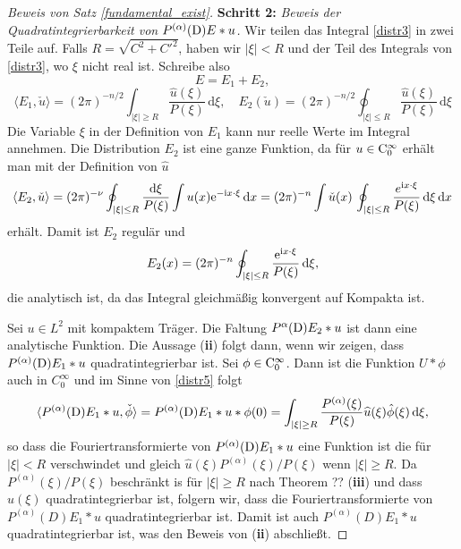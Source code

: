 \begin{proof}[Beweis von Satz \ref{fundamental_exist}]
\textbf{Schritt 2:} \emph{Beweis der Quadratintegrierbarkeit von $P^{(\alpha)}(\mathrm D) E * u$.}
Wir teilen das Integral \eqref{distr3} in zwei Teile auf. Falls $R=\sqrt{C^2 + C'^2}$, haben wir $|\xi|<R$ und der Teil des Integrals von \eqref{distr3}, wo $\xi$ nicht real ist. Schreibe also 
\begin{equation}\label{distr4}
E=E_1 + E_2,
\end{equation}
\begin{equation}\label{distr5}
\langle E_1,\check u\rangle = (2\pi)^{-n/2} \int_{|\xi|\ge R} \frac{\widehat u(\xi)}{P(\xi)}\, \mathrm d\xi, \quad E_2(\check u)= (2\pi)^{-n/2} \oint_{|\xi|\le R} \frac{\widehat u(\xi)}{P(\xi)}\, \mathrm d\xi
\end{equation}
Die Variable $\xi$ in der Definition von $E_1$ kann nur reelle Werte im Integral annehmen. Die Distribution $E_2$ ist eine ganze Funktion, da für $u\in\mathrm C_0^\infty$ erhält man mit der Definition von $\widehat u$
\begin{equation}
\langle E_2, \check u\rangle = (2\pi)^{-\nu} \oint_{|\xi |\le R} \frac{\mathrm d\xi}{P(\xi)} \int u(x) \mathrm e^{-\mathrm i x\cdot\xi}\, \mathrm dx= (2\pi)^{-n} \int \check u(x) \, \oint_{|\xi|\le R} \frac{e^{\mathrm i x\cdot \xi}}{P(\xi)}\, \mathrm d\xi \, \mathrm dx
\end{equation}
erhält. Damit ist $E_2$ regulär und
\begin{equation}
E_2(x) = (2\pi)^{-n} \oint_{|\xi|\le R} \frac{\mathrm e^{\mathrm i x\cdot \xi}}{P(\xi)}\, \mathrm d\xi,
\end{equation}
die analytisch ist, da das Integral gleichmäßig konvergent auf Kompakta ist. 

Sei $u\in L^2$ mit kompaktem Träger. Die Faltung $P^{\alpha}(\mathrm D)E_2 *u$ ist dann eine analytische Funktion.  Die Aussage ({\bf ii}) folgt dann, wenn wir zeigen, dass $P^{(\alpha)}(\mathrm D) E_1 * u$ quadratintegrierbar ist.  Sei $\phi \in\mathrm C_0^\infty$. Dann ist die Funktion $U*\phi$ auch in $C_0^\infty$ und im Sinne von \eqref{distr5} folgt
\begin{equation}
\langle P^{(\alpha)} (\mathrm D) E_1 * u, \check \phi\rangle  = P^{(\alpha)}(\mathrm D) E_1 * u * \phi(0) = \int_{|\xi| \ge R} \frac{P^{(\alpha)}(\xi)}{P(\xi)} \widehat u(\xi) \hat \phi(\xi) \, \mathrm d\xi,
\end{equation}     
so dass die Fouriertransformierte von $P^{(\alpha)}(\mathrm D) E_1 * u$ eine Funktion ist die für $|\xi|<R$ verschwindet und gleich $\hat u(\xi) P^{(\alpha)}(\xi)/P(\xi)$ wenn $|\xi|\ge R$. Da $P^{(\alpha)}(\xi)/P(\xi)$ beschränkt is für $|\xi|\ge R$ nach Theorem ?? ({\bf iii})  und dass $\hat u(\xi)$ quadratintegrierbar ist, folgern wir, dass die Fouriertransformierte von $P^{(\alpha)}(D) E_1 * u$ quadratintegrierbar ist. Damit ist auch $P^{(\alpha)}(D) E_1 * u$ quadratintegrierbar ist, was den Beweis von ({\bf ii}) abschließt.  


\end{proof}
